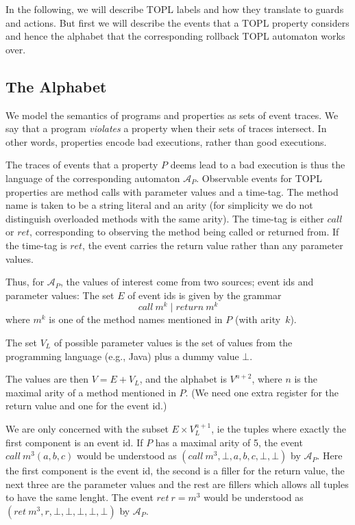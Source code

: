\documentclass{article} %
\newcommand{\A}{\ensuremath{\mathcal{A}}}
\theoremstyle{definition}
\theoremstyle{remark}
\begin{document}
In the following, we will describe TOPL labels and how they translate to guards
and actions. But first we will describe the events that a TOPL
property considers and hence the alphabet that the corresponding
rollback TOPL automaton works over.

\subsection{The Alphabet}

We model the semantics of programs and properties as sets of event
traces. We say that a program \emph{violates} a property when their sets of traces intersect.
In other words, properties encode bad executions, rather than good executions.

The traces of events that a property $P$ deems lead to a bad execution is thus the language
of the corresponding automaton $\A_P$. Observable events for TOPL properties are method calls
with parameter values and a time-tag. The method name is taken to be a
string literal and an arity (for simplicity we do not distinguish
overloaded methods with the same arity). The time-tag is either $call$ or $ret$,
corresponding to observing the method being called or returned
from. If the time-tag is $ret$, the event carries the return value
rather than any parameter values.

Thus, for $\A_P$, the values of interest come from two
sources; event ids and parameter values: The set $E$ of event ids is given by
the grammar
\[
call\ m^k \mid return\ m^k
\]
where $m^k$ is one of the method names mentioned in $P$ (with arity~$k$).

The set $V_L$ of possible parameter values is the set of values from
the programming language (e.g., Java)
plus a dummy value $\bot$.

The values are then $V = E + V_L$, and the alphabet is $V^{n+2}$,
where $n$ is the maximal arity of a method mentioned in $P$.
(We need one extra register for the return value and one for the event
id.)

We are only concerned with the subset $E \times V_L^{n+1}$, ie the
tuples where exactly the first component is an event
id. If $P$ has a maximal arity of 5, the event $call\ m^3(a, b, c)$
would be understood as $(call\ m^3, \bot,  a, b, c, \bot, \bot)$ by
$\A_P$. Here the first component is the event id, the second is a
filler for the return value, the next three are the parameter values and the rest are
fillers which allows all tuples to have the same lenght. The event $ret\ r = m^3$
would be understood as $(ret\ m^3, r, \bot, \bot, \bot, \bot, \bot)$ by
$\A_P$.
\end{document}
